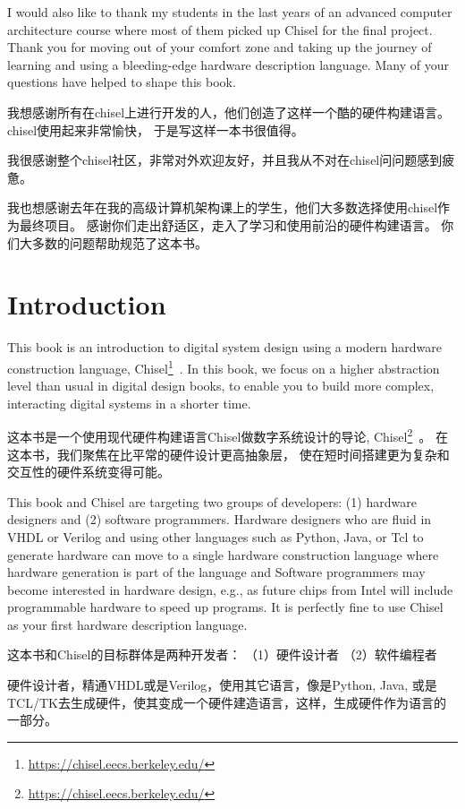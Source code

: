 \documentclass[%
    10pt,
    headinclude, footexclude,
    openright, %
    notitlepage,
    cleardoubleempty,
    headsepline,
    pointlessnumbers,
    bibtotoc, idxtotoc,
    ]{scrbook}
\newcommand{\myref}[2]{\href{#1}{#2}}
\renewcommand{\myref}[2]{{#2}{\footnote{\url{#1}}}}
\begin{document}
I would also like to thank my students in the last years of an advanced computer
architecture course where most of them picked up Chisel for the final project.
Thank you for moving out of your comfort zone and taking up the journey of
learning and using a bleeding-edge hardware description language.
Many of your questions have helped to shape this book.

我想感谢所有在chisel上进行开发的人，他们创造了这样一个酷的硬件构建语言。chisel使用起来非常愉快，
于是写这样一本书很值得。

我很感谢整个chisel社区，非常对外欢迎友好，并且我从不对在chisel问问题感到疲惫。

我也想感谢去年在我的高级计算机架构课上的学生，他们大多数选择使用chisel作为最终项目。
感谢你们走出舒适区，走入了学习和使用前沿的硬件构建语言。
你们大多数的问题帮助规范了这本书。


\mainmatter

\chapter{Introduction}
\label{sec:intro}

This book is an introduction to digital system design using a modern hardware
construction language, \myref{https://chisel.eecs.berkeley.edu/}{Chisel}~\cite{chisel:dac2012}.
In this book, we focus on a higher abstraction level than usual in digital design books,
to enable you to build more complex, interacting digital systems in a shorter time.

这本书是一个使用现代硬件构建语言Chisel做数字系统设计的导论, 
\myref{https://chisel.eecs.berkeley.edu/}{Chisel}~\cite{chisel:dac2012}。
在这本书，我们聚焦在比平常的硬件设计更高抽象层，
使在短时间搭建更为复杂和交互性的硬件系统变得可能。

This book and Chisel are targeting two groups of developers:
(1) hardware designers and (2) software programmers.
Hardware designers who are fluid in VHDL or Verilog and using other languages such as Python,
Java, or Tcl to generate hardware can move to a single hardware construction language
where hardware generation is part of the language and
Software programmers may become interested in hardware design,
e.g., as future chips from Intel will include programmable hardware to speed up programs.
It is perfectly fine to use Chisel as your first hardware description language.

这本书和Chisel的目标群体是两种开发者：
（1）硬件设计者 （2）软件编程者

硬件设计者，精通VHDL或是Verilog，使用其它语言，像是Python, Java, 或是TCL/TK去生成硬件，使其变成一个硬件建造语言，这样，生成硬件作为语言的一部分。
\end{document}
